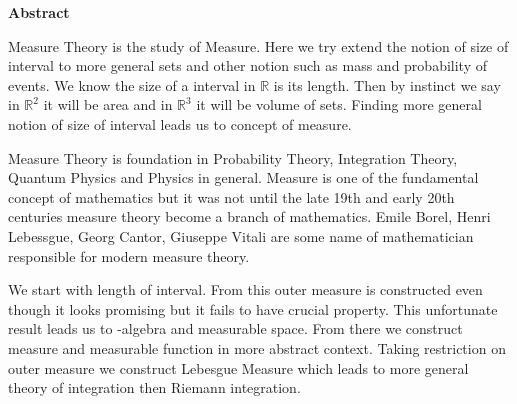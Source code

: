 \begin{center}
    \LARGE{\textbf{Abstract}}
\end{center}

Measure Theory is the study of Measure. Here we try extend the notion of size of interval to more general sets and other notion such as mass and probability of events. We know the size of a interval in $\mathds{R}$ is 
its length. Then by instinct we say in $\mathds{R}^{2}$ it will be area and in $\mathds{R}^{3}$ it will be volume of sets. Finding more general notion of size of
interval leads us to concept of measure.

Measure Theory is foundation in Probability Theory, Integration Theory, Quantum Physics and Physics in general. Measure is one of the fundamental
concept of mathematics but it was not until the late 19th and early 20th centuries measure theory become a branch of mathematics. 
Emile Borel, Henri Lebessgue, Georg Cantor, Giuseppe Vitali are some name of mathematician responsible for modern measure theory.

We start with length of interval. From this outer measure is constructed even though it looks promising but it fails to have crucial property. This unfortunate result leads us to \sig-algebra and measurable space. From there we construct measure and measurable function in more abstract context. Taking restriction on outer measure we construct Lebesgue Measure
which leads to more general theory of integration then Riemann integration.
